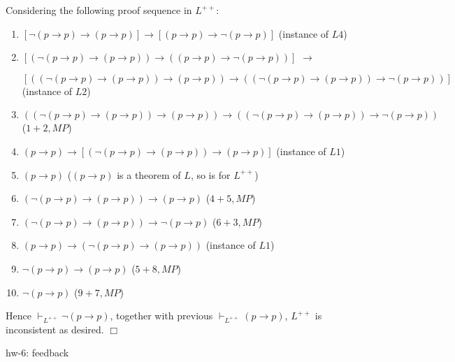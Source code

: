 \documentclass[UTF8,12pt,a4paper]{ctexart}
\begin{document}
Considering the  following proof sequence  in $L^{++}$:
\begin{enumerate}
	\item $[\neg (p \to p) \to (p \to p)]   \to [(p \to p) \to \neg (p \to p)]$ 
	\hfill  (instance of $L4$)
	
	\item $[ (\neg (p \to p) \to (p \to p))   \to ((p \to p) \to \neg (p \to p)) ]$ $\to$
	
	$[
	((\neg (p \to p) \to (p \to p)) \to (p \to p) )  \to 
	(
	(\neg (p \to p) \to (p \to p)) \to \neg (p \to p)
	)
	]$
	\hfill  (instance of $L2$)
	
	\item $((\neg (p \to p) \to (p \to p)) \to (p \to p) )  \to 
	(
	(\neg (p \to p) \to (p \to p)) \to \neg (p \to p)
	)$
	\hfill ($1 + 2, MP$)
	
	\item $(p \to p) \to [(\neg (p \to p) \to (p \to p)) \to (p \to p)]$ 
	\hfill (instance of $L1$)
	
	\item $(p \to p) $ 
	\hfill ($(p\to p)$ is a theorem of $L$, so is for $L^{++}$)
	
	\item $(\neg (p \to p) \to (p \to p)) \to (p \to p) $
	\hfill ($4+5, MP$)
	
	\item $(\neg (p \to p) \to (p \to p)) \to \neg (p \to p)$
	\hfill ($6+3, MP$)
	
	\item $(p \to p) \to ( \neg (p \to p) \to (p \to p))$ 
	\hfill (instance of $L1$)
	
	\item $ \neg (p \to p) \to (p \to p)$ 
	\hfill ($5+8, MP$)
	
	\item $\neg (p \to p)$
	\hfill ($9+7, MP$)
\end{enumerate}

\noindent 
Hence $\vdash_{L^{++}} \neg (p \to p)$, together with previous  $\vdash_{L^{++}} (p \to p)$, $L^{++}$ is inconsistent as desired.
\hfill $\Box$



\vspace{1em}
\dotfill hw-6: feedback
\dotfill
\end{document}
